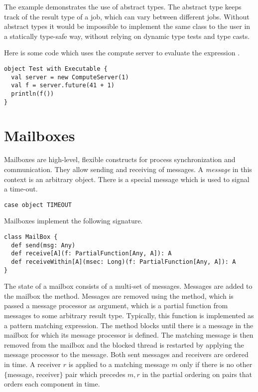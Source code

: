 {The example demonstrates the use of abstract types. The abstract type
 keeps track of the result type of a job, which can vary
between different jobs. Without abstract types it would be impossible
to implement the same class to the user in a statically type-safe
way, without relying on dynamic type tests and type casts.


Here is some code which uses the compute server to evaluate 
the expression .
\begin{lstlisting}
object Test with Executable {
  val server = new ComputeServer(1)
  val f = server.future(41 + 1)
  println(f())
}
\end{lstlisting}

\section{Mailboxes}
\label{sec:mailbox}

Mailboxes are high-level, flexible constructs for process
synchronization and communication. They allow sending and receiving of
messages. A {\em message} in this context is an arbitrary object.
There is a special message  which is used to signal a
time-out.
\begin{lstlisting}
case object TIMEOUT
\end{lstlisting}
Mailboxes implement the following signature.
\begin{lstlisting}
class MailBox {
  def send(msg: Any)
  def receive[A](f: PartialFunction[Any, A]): A
  def receiveWithin[A](msec: Long)(f: PartialFunction[Any, A]): A
}
\end{lstlisting}
The state of a mailbox consists of a multi-set of messages.
Messages are added to the mailbox the  method. Messages
are removed using the  method, which is passed a message
processor  as argument, which is a partial function from
messages to some arbitrary result type. Typically, this function is
implemented as a pattern matching expression. The 
method blocks until there is a message in the mailbox for which its
message processor is defined.  The matching message is then removed
from the mailbox and the blocked thread is restarted by applying the
message processor to the message. Both sent messages and receivers are
ordered in time. A receiver $r$ is applied to a matching message $m$
only if there is no other $\{$message, receiver$\}$ pair which precedes ${m,
r}$ in the partial ordering on pairs that orders each component in
time.

}

